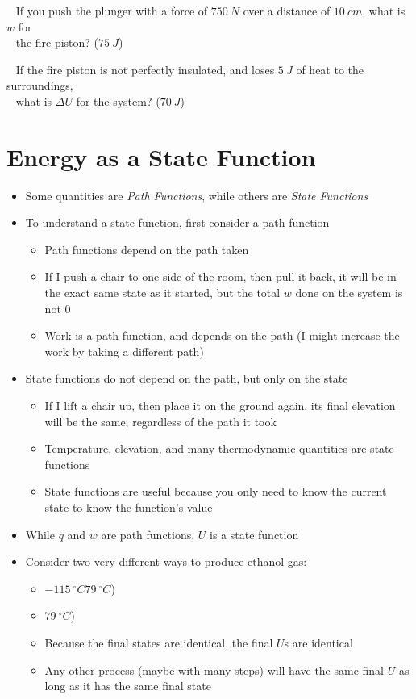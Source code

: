 \documentclass[12pt, openany, letterpaper]{memoir}
\begin{document}
\begin{itemize}
	~\hphantom{Practice:} If you push the plunger with a force of $750~N$ over a distance of $10~cm$, what is $w$ for\\
	~\hphantom{Practice: } the fire piston? ($75~J$)
	
	~\hphantom{Practice:} If the fire piston is not perfectly insulated, and loses $5~J$ of heat to the surroundings,\\
	~\hphantom{Practice: } what is $\Delta U$ for the system? ($70~J$)
\end{itemize}
\section{Energy as a State Function}
\begin{itemize}
	\item Some quantities are \emph{Path Functions}, while others are \emph{State Functions}
	\item To understand a state function, first consider a path function
	\begin{itemize}
		\item Path functions depend on the path taken
		\item If I push a chair to one side of the room, then pull it back, it will be in the exact same state as it started, but the total $w$ done on the system is not $0$
		\item Work is a path function, and depends on the path (I might increase the work by taking a different path)
	\end{itemize}
	\item State functions do not depend on the path, but only on the state
	\begin{itemize}
		\item If I lift a chair up, then place it on the ground again, its final elevation will be the same, regardless of the path it took
		\item Temperature, elevation, and many thermodynamic quantities are state functions
		\item State functions are useful because you only need to know the current state to know the function's value
	\end{itemize}
	\item While $q$ and $w$ are path functions, $U$ is a state function
	\item Consider two very different ways to produce ethanol gas:
	\begin{itemize}
		\item {}$-115~^\circ C$$79~^\circ C$)
		\item {}$79~^\circ C$)
		\item Because the final states are identical, the final $U$s are identical
		\item Any other process (maybe with many steps) will have the same final $U$ as long as it has the same final state
	\end{itemize}
\end{itemize}
\end{document}
